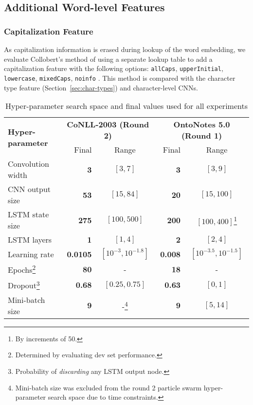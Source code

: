 \documentclass[11pt,letterpaper]{article}
\begin{document}
\subsection{Additional Word-level Features}

\subsubsection{Capitalization Feature}
\label{sec:caps}
As capitalization information is erased during lookup of the word embedding, we evaluate Collobert's  method of using a separate lookup table to add a capitalization feature with the following options: {\tt allCaps}, {\tt upperInitial}, {\tt lowercase}, {\tt mixedCaps}, {\tt noinfo} \cite{collobert2011}. This method is compared with the character type feature (Section~\ref{sec:char-types}) and character-level CNNs.






\begin{savenotes}
\begin{table*}[t]
\begin{center}
\small
\begin{tabular}{|l|r|c|r|c|}
\hline \multirow{2}{*}{\bf Hyper-parameter} & \multicolumn{2}{c|}{\bf CoNLL-2003 (Round 2)} & \multicolumn{2}{c|}{\bf OntoNotes 5.0 (Round 1)} \\ \cline{2-5}
& Final & Range & Final & Range \\ \hline
Convolution width & \bf 3 & $[3,7]$ & \bf 3 & $[3,9]$ \\
CNN output size & \bf 53 & $[15,84]$ & \bf 20 & $[15,100]$ \\
LSTM state size & \bf 275 & $[100,500]$ & \bf 200 & $[100,400]$\footnote{By increments of 50.}\\
LSTM layers & \bf 1 & $[1,4]$ & \bf 2 & $[2,4]$ \\
Learning rate & \bf 0.0105 & $[10^{-3},10^{-1.8}]$ & \bf 0.008 & $[10^{-3.5},10^{-1.5}]$ \\
Epochs\footnote{Determined by evaluating dev set performance.} & \bf 80 & \-- & \bf 18 & \-- \\
Dropout\footnote{Probability of \emph{discarding} any LSTM output node.} & \bf 0.68 & $[0.25,0.75]$ & \bf \bf 0.63 & $[0,1]$\\
Mini-batch size & \bf 9 & \--\footnote{Mini-batch size was  excluded from the round 2 particle swarm hyper-parameter search space due to time constraints.} & \bf 9 & $[5,14]$ \\
\hline
\end{tabular}
\end{center}
\caption{Hyper-parameter search space and final values used for all experiments}
\label{tab:hyperparams}
\end{table*}
\end{savenotes}
\end{document}
